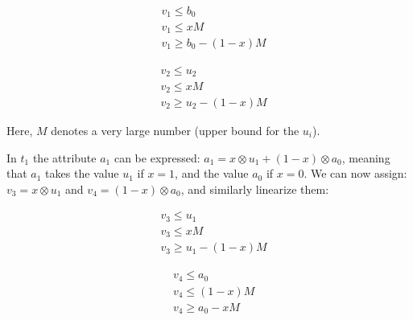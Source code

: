 \begin{minipage}{0.7\textwidth}
    \begin{minipage}[t]{0.2\textwidth}
        \begin{align*}
            &v_1\le b_0\\
            &v_1\le xM\\
            &v_1\ge b_0 - (1-x)M
        \end{align*}
    \end{minipage}
    \hspace{4em}
    \begin{minipage}[t]{0.2\textwidth}
        \begin{align*}
            &v_2\le u_2\\
            &v_2\le xM\\
            &v_2\ge u_2 - (1-x)M
        \end{align*}
    \end{minipage}
\end{minipage}

\smallskip

Here, $M$ denotes a very large number (upper bound for the $u_i$).

\smallskip

In $t_1$ the attribute $a_1$ can be expressed: $a_1=x\otimes u_1 +
(1-x)\otimes a_0$, meaning that $a_1$ takes the value $u_1$ if $x=1$, and the
value $a_0$ if $x=0$.  We can now assign: $v_3= x\otimes
u_1$ and $v_4=(1-x)\otimes a_0$, and similarly linearize them:

\begin{minipage}{0.7\textwidth}
    \begin{minipage}[t]{0.2\textwidth}
        \begin{align*}
            &v_3\le u_1\\
            &v_3\le xM\\
            &v_3\ge u_1 - (1-x)M
        \end{align*}
    \end{minipage}
    \hspace{4em}
    \begin{minipage}[t]{0.2\textwidth}
        \begin{align*}
            &v_4\le a_0\\
            &v_4\le (1-x)M\\
            &v_4\ge a_0 - xM
        \end{align*}
    \end{minipage}
\end{minipage}

